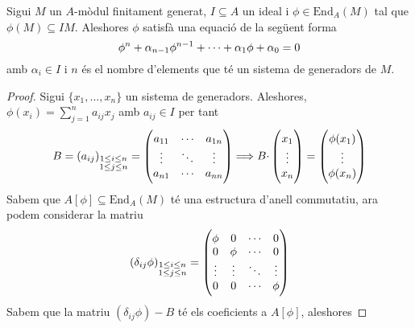 \documentclass[../../../main.tex]{subfiles}
\begin{document}
\begin{prop}
\label{prop:trucDeterminantal} Sigui $M$ un $A$-mòdul finitament generat, $I\subseteq A$ un ideal i $\phi\in\mathrm{End}_A(M)$ tal que $\phi(M)\subseteq IM$. Aleshores $\phi$ satisfà una equació de la següent forma
\begin{equation}
    \notag
    \phi^n+\alpha_{n-1}\phi^{n-1}+\cdots+\alpha_1\phi+\alpha_0 = 0
\end{equation}
amb $\alpha_i\in I$ i $n$ és el nombre d'elements que té un sistema de generadors de $M$.
\end{prop}
\begin{proof}
Sigui $\{x_1,\ldots,x_n\}$ un sistema de generadors. Aleshores, $\phi(x_i) = \sum_{j=1}^na_{ij}x_j$ amb $a_{ij}\in I$ per tant
\begin{equation}
    \notag
    B = (a_{ij})_{\substack{1\leq i\leq n\\1\leq j\leq n}} =
    \begin{pmatrix}
    a_{11} & \cdots & a_{1n}\\
    \vdots & \ddots & \vdots \\
    a_{n1} & \cdots & a_{nn}
    \end{pmatrix}
    \Longrightarrow B\cdotp
    \begin{pmatrix}
    x_1\\
    \vdots\\
    x_n
    \end{pmatrix}
    =
    \begin{pmatrix}
    \phi(x_1)\\
    \vdots \\
    \phi(x_n)
    \end{pmatrix}
\end{equation}
Sabem que $A[\phi]\subseteq \mathrm{End}_A(M)$ té una estructura d'anell commutatiu, ara podem considerar la matriu
\begin{equation}
    \notag
    (\delta_{ij}\phi)_{\substack{1\leq i\leq n\\1\leq j\leq n}} = 
    \begin{pmatrix}
    \phi & 0 & \cdots & 0 \\
    0 & \phi & \cdots & 0 \\
    \vdots & \vdots & \ddots & \vdots \\
    0 & 0 & \cdots & \phi
    \end{pmatrix}
\end{equation}
Sabem que la matriu $(\delta_{ij}\phi)-B$ té els coeficients a $A[\phi]$, aleshores

\end{proof}
\end{document}
